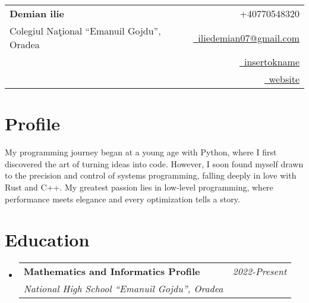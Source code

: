 \documentclass[a4paper,11pt]{article}
\makeatletter
\newcommand{\resumeSubheading}[4]{
\vspace{0.5mm}\item
    \begin{tabular*}{0.98\textwidth}[t]{l@{\extracolsep{\fill}}r}
        \textbf{#1} & \textit{\footnotesize{#4}} \\
        \textit{\footnotesize{#3}} &  \footnotesize{#2}\\
    \end{tabular*}
    \vspace{-2.4mm}
}
\newcommand{\resumeSubHeadingListStart}{\begin{itemize}[leftmargin=*,labelsep=0mm]}
\newcommand{\resumeSubHeadingListEnd}{\end{itemize}\vspace{2mm}}
\newcommand{\name}{Demian ilie} %
\newcommand{\phone}{+40770548320} %
\newcommand{\emaila}{iliedemian07@gmail.com} %
\makeatother
\begin{document}
\selectfont

%     
\parbox{\dimexpr\linewidth-1.7cm\relax}{
    \begin{tabularx}{\linewidth}{L r}                                                                                                                                              \\
        \textbf{\Large \name}                         & {\raisebox{0.0\height}{\footnotesize \faPhone}\ \phone}                                                        \\
        {Colegiul Naţional ``Emanuil Gojdu'', Oradea} & \href{mailto:\emaila}{\raisebox{0.0\height}{\footnotesize \faEnvelope}\ {\emaila}}                             \\
                                                      & \href{https://github.com/insertokname}{\raisebox{0.0\height}{\footnotesize \faGithub}\ {insertokname}}         \\
                                                      & \href{https://insertokname.github.io/personal-page/}{\raisebox{0.0\height}{\footnotesize \faGlobe}\ {website}}
    \end{tabularx}
}

\vspace{-0.5cm}
\section{\textbf{Profile}}
\begin{justify}
    My programming journey began at a young age with Python, where I first discovered the art of turning ideas into code.
    However, I soon found myself drawn to the precision and control of systems programming, falling deeply in love with Rust and C++.
    My greatest passion lies in low-level programming, where performance meets elegance and every optimization tells a story.
\end{justify}


\section{\textbf{Education}}
\resumeSubHeadingListStart
\resumeSubheading
{Mathematics and Informatics Profile}{}
{National High School ``Emanuil Gojdu'', Oradea}{2022-Present}
\resumeSubHeadingListEnd
\vspace{-5.5mm}
\end{document}
